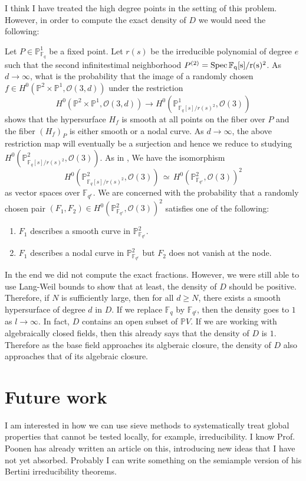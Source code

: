 \documentclass[12pt]{article}
\theoremstyle{plain}
\theoremstyle{definition}
\newcommand{\IF}{\mathbb{F}}
\newcommand{\IP}{\mathbb{P}}
\newcommand{\sO}{\mathcal{O}}
\newcommand{\Spec}{\rm Spec\,}
\newcommand\iso{{\, \simeq \,}}
\newcommand{\<}{\langle}
\renewcommand{\>}{\rangle}
\begin{document}
I think I have treated the high degree points in the setting of this problem. However, in order to compute the exact density of $D$ we would need the following:

Let $P \in \IP^1_{\IF_q}$ be a fixed point. Let $r(s)$ be the irreducible polynomial of degree $e$ such that the second infinitestimal neighborhood $P^{(2)} = \Spec \IF_q[s]/r(s)^2$. As $d \to \infty$, what is the probability that the image of a randomly chosen $f \in H^0(\IP^2 \times \IP^1, \sO(3, d))$ under the restriction 
$$ H^0(\IP^2 \times \IP^1, \sO(3, d)) \to H^0(\IP^1_{\IF_q[s]/r(s)^2}, \sO(3))$$
shows that the hypersurface $H_f$ is smooth at all points on the fiber over $P$ and the fiber $(H_f)_P$ is either smooth or a nodal curve. As $d \to \infty$, the above restriction map will eventually be a surjection and hence we reduce to studying $H^0(\IP^2_{\IF_q[s]/r(s)^2}, \sO(3))$. As in \cite{Wood}, We have the isomorphism 
$$ H^0(\IP^2_{\IF_q[s]/r(s)^2}, \sO(3)) \iso H^0(\IP^2_{\IF_{q^e}}, \sO(3))^2 $$
as vector spaces over $\IF_{q^e}$. We are concerned with the probability that a randomly chosen pair $(F_1, F_2) \in H^0(\IP^2_{\IF_{q^e}}, \sO(3))^2$ satisfies one of the following:
\begin{enumerate}
\item $F_1$ describes a smooth curve in $\IP^2_{\IF_{q^e}}$. 
\item $F_1$ describes a nodal curve in $\IP^2_{\IF_{q^e}}$ but $F_2$ does not vanish at the node. 
\end{enumerate}

In the end we did not compute the exact fractions. However, we were still able to use Lang-Weil bounds to show that at least, the density of $D$ should be positive. Therefore, if $N$ is sufficiently large, then for all $d \ge N$, there exists a smooth hypersurface of degree $d$ in $D$. If we replace $\IF_q$ by $\IF_{q^l}$, then the density goes to $1$ as $l \to \infty$. In fact, $D$ contains an open subset of $\IP V$. If we are working with algebraically closed fields, then this already says that the density of $D$ is $1$. Therefore as the base field approaches its algberaic closure, the density of $D$ also approaches that of its algebraic closure. 

\section{Future work}
I am interested in how we can use sieve methods to systematically treat global properties that cannot be tested locally, for example, irreducibility. I know Prof. Poonen has already written an article on this, introducing new ideas that I have not yet absorbed. Probably I can write something on the semiample version of his Bertini irreducibility theorems.
\end{document}
